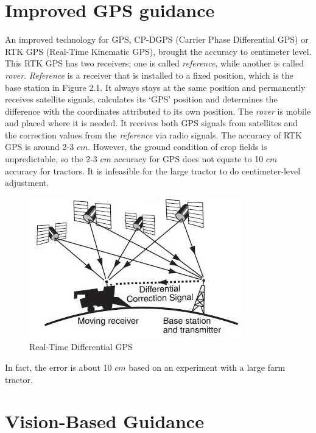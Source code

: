 \section{Improved GPS guidance}
An improved technology for GPS, CP-DGPS (Carrier Phase Differential GPS) or RTK GPS (Real-Time Kinematic GPS), brought the accuracy to centimeter level. This RTK GPS has two receivers; one is called \textit{reference}, while another is called \textit{rover}. \textit{Reference} is a receiver that is installed to a fixed position, which is the base station in Figure 2.1. It always stays at the same position and permanently receives satellite signals, calculates its ‘GPS’ position and determines the difference with the coordinates attributed to its own position. The \textit{rover} is mobile and placed where it is needed. It receives both GPS signals from satellites and the correction values from the \textit{reference} via radio signals. The accuracy of RTK GPS is around 2-3 $cm$. \cite{lambiel2004contribution} However, the ground condition of crop fields is unpredictable, so the 2-3 $cm$ accuracy for GPS does not equate to 10 $cm$ accuracy for tractors. It is infeasible for the large tractor to do centimeter-level adjustment.
\begin{figure}[ht!]
\begin{center}
\includegraphics[scale = 1.1]{pics/RTGPS.jpg}
\caption{Real-Time Differential GPS}
\end{center}
\end{figure}
In fact, the error is about 10 $cm$ based on an experiment with a large farm tractor. \cite{thuilot2002automatic} 

\section{Vision-Based Guidance}


